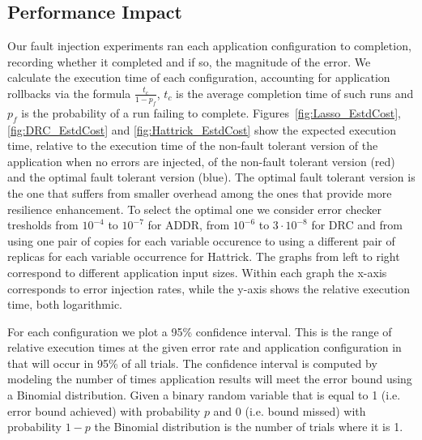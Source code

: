 \documentclass{sig-alternate}
\newcommand{\sui}[1]{%
  \textcolor{green}{SC - #1}
}
\newcommand{\greg}[1]{%
  \textcolor{blue}{GB: #1}
}
\begin{document}

\subsection{Performance Impact}
\label{sec:eval:perf}

Our fault injection experiments ran each application configuration to completion, recording whether it completed and if so, the magnitude of the error.
We calculate the execution time of each configuration, accounting for application rollbacks via the formula $\frac{t_c}{1-p_f}$, $t_c$ is the average completion time of such runs and $p_f$ is the probability of a run failing to complete.
Figures~\ref{fig:Lasso_EstdCost}, \ref{fig:DRC_EstdCost} and \ref{fig:Hattrick_EstdCost} show the expected execution time, relative to the execution time of the non-fault tolerant version of the application when no errors are injected, of the non-fault tolerant version (red) and the optimal fault tolerant version (blue). 
The optimal fault tolerant version is the one that suffers from smaller overhead among the ones that provide more resilience enhancement. 
To select the optimal one we consider error checker tresholds from $10^{-4}$ to $10^{-7}$ for ADDR, from $10^{-6}$ to $3 \cdot 10^{-8}$ for DRC and from using one pair of copies for each variable occurence to using a different pair of replicas for each variable occurrence for Hattrick.     
The graphs from left to right correspond to different application input sizes.
Within each graph the x-axis corresponds to error injection rates, while the y-axis shows the relative execution time, both logarithmic.

For each configuration we plot a 95\% confidence interval.
This is the range of relative execution times at the given error rate and application configuration in that will occur in 95\% of all trials.
The confidence interval is computed by modeling the number of times application results will meet the error bound using a Binomial distribution.
Given a binary random variable that is equal to 1 (i.e. error bound achieved) with probability $p$ and 0 (i.e. bound missed) with probability $1-p$ the Binomial distribution is the number of trials where it is 1.
\end{document}
